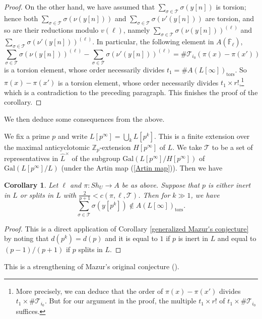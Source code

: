\documentclass[11pt,oneside,reqno]{amsart}
\newcommand{\Gal}{\mathrm{Gal}}
\newcommand{\F}{\mathbb{F}}
\newcommand{\Z}{\mathbb{Z}}
\newcommand{\Tcal}{\mathcal{T}}
\theoremstyle{plain}
\newtheorem{corollary}[theorem]{Corollary}
\begin{document}
\begin{proof}
		On the other hand, we have assumed that $\sum_{\sigma\in\Tcal}\sigma(y[n])$ is torsion; hence both $\sum_{\sigma\in\Tcal}\sigma(\nu(y[n]))$ and $\sum_{\sigma\in\Tcal}\sigma(\nu'(y[n]))$ are torsion, and so are their reductions modulo $v(\ell)$, namely $\sum_{\sigma\in\Tcal}\sigma(\nu(y[n]))^{(\ell)}$ and $\sum_{\sigma\in\Tcal}\sigma(\nu'(y[n]))^{(\ell)}$. In particular, the following element in $A(\overline{\F}_\ell)$,
		\[
		\sum_{\sigma\in\Tcal}\sigma(\nu(y[n]))^{(\ell)}-\sum_{\sigma\in\Tcal}\sigma(\nu'(y[n]))^{(\ell)}
		=
		\#\Tcal_{i_0}(\pi(x)-\pi(x'))
		\]
		is a torsion element, whose order necessarily divides $t_1=\#A(L[\infty])_\mathrm{tors}$. So $\pi(x)-\pi(x')$ is a torsion element, whose order necessarily divides $t_1\times r!$,\footnote{More precisely, we can deduce that the order of $\pi(x)-\pi(x')$ divides $t_1\times\#\Tcal_{i_0}$. But for our argument in the proof, the multiple $t_1\times r!$ of $t_1\times\#\Tcal_{i_0}$ suffices.} which is a contradiction to the preceding paragraph. This finishes the proof of the corollary.
	\end{proof}
	
	
	
	
	We then deduce some consequences from the above.
	
	
	We fix a prime $p$ and write $L[p^\infty]=\bigcup_kL[p^k]$. This is a finite extension over the maximal anticyclotomic $\Z_p$-extension $H[p^\infty]$ of $L$. We take $\Tcal$ to be a set of representatives in $\widehat{L}^\times$ of the subgroup $\Gal(L[p^\infty]/H[p^\infty])$ of $\Gal(L[p^\infty]/L)$ (under the Artin map (\ref{Artin map})). Then we have
	\begin{corollary}\label{vertical Mazur's conjecture}
		Let $\ell$ and $\pi\colon Sh_U\to A$ be as above. Suppose that $p$ is either inert in $L$ or splits in $L$ with $\frac{2}{p+1}<c(\pi,\ell,\Tcal)$. Then for $k\gg1$, we have
		\[
		\sum_{\sigma\in\Tcal}\sigma(y[p^k])\notin
		A(L[\infty])_\mathrm{tors}.
		\]
	\end{corollary}
	\begin{proof}
		This is a direct application of Corollary \ref{generalized Mazur's conjecture} by noting that $d(p^k)=d(p)$ and it is equal to $1$ if $p$ is inert in $L$ and equal to $(p-1)/(p+1)$ if $p$ splits in $L$.
	\end{proof}
	This is a strengthening of Mazur's original conjecture (\cite{Mazur1983}).
	
	
	
\end{document}
